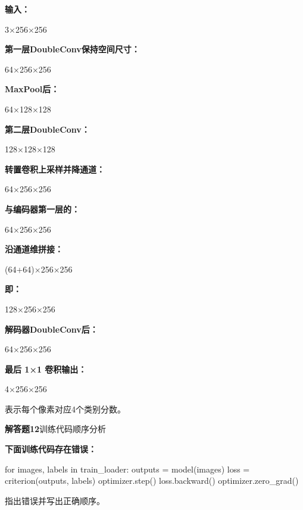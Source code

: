 \documentclass[UTF8,openany,oneside,zihao=-4,fontset=windows]{ctexbook}
\newif\ifshowsolutions
\newcommand{\Question}[2]{%
  \par\Needspace{4\baselineskip}\medskip
  \noindent\textbf{\color{MVBlue}#1}\quad #2\par
}
\newenvironment{AnswerBox}{\begin{tcolorbox}[breakable,colback=MVLight,colframe=MVBlue!45,title={参考答案},fonttitle=\bfseries,boxrule=0.55pt,arc=1.5mm,left=2mm,right=2mm,top=1.5mm,bottom=1.5mm]}{\end{tcolorbox}}
\newcommand{\PracticeSpace}[1]{\ifshowsolutions\else\par\vspace{#1}\par\fi}
\begin{document}
\begin{AnswerBox}
\par\noindent\textbf{输入：}
\par 3×256×256
\par\noindent\textbf{第一层DoubleConv保持空间尺寸：}
\par 64×256×256
\par\noindent\textbf{MaxPool后：}
\par 64×128×128
\par\noindent\textbf{第二层DoubleConv：}
\par 128×128×128
\par\noindent\textbf{转置卷积上采样并降通道：}
\par 64×256×256
\par\noindent\textbf{与编码器第一层的：}
\par 64×256×256
\par\noindent\textbf{沿通道维拼接：}
\par (64+64)×256×256
\par\noindent\textbf{即：}
\par 128×256×256
\par\noindent\textbf{解码器DoubleConv后：}
\par 64×256×256
\par\noindent\textbf{最后 1×1 卷积输出：}
\par 4×256×256
\par 表示每个像素对应4个类别分数。
\end{AnswerBox}
\else
\PracticeSpace{4.2cm}
\fi
\Question{解答题12}{训练代码顺序分析}
\par\noindent\textbf{下面训练代码存在错误：}
\begin{CodeBlock}
for images, labels in train_loader:
    outputs = model(images)
    loss = criterion(outputs, labels)
    optimizer.step()
    loss.backward()
    optimizer.zero_grad()
\end{CodeBlock}
\par 指出错误并写出正确顺序。
\ifshowsolutions
\begin{AnswerBox}
\par\noindent\textbf{原代码的问题是：}
\par\noindent\textbullet\quad 在反向传播前调用了 optimizer.step()；
\par\noindent\textbullet\quad 梯度还没有计算，无法正确更新参数；
\par 清空梯度的位置不合理。
\par\noindent\textbf{正确顺序为：}
\begin{CodeBlock}
for images, labels in train_loader:
    optimizer.zero_grad()

    outputs = model(images)
    loss = criterion(outputs, labels)

    loss.backward()
    optimizer.step()
\end{CodeBlock}
\par\noindent\textbf{对应过程：}
\par 梯度清零
\par → 前向传播
\par → 计算损失
\par → 反向传播
\par → 更新参数
\end{AnswerBox}
\else
\PracticeSpace{4.2cm}
\fi
\end{document}
